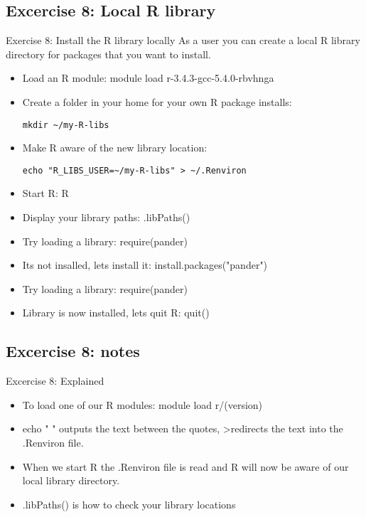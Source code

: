 \documentclass[handout]{beamer} %
\begin{document}
\subsection{Excercise 8: Local R library}
\begin{frame}[fragile]{Exercise 8: Install the R library locally}
As a user you can create a local R library directory for packages that you want to install. 
\begin{itemize}
\item Load an R module: 
module load r-3.4.3-gcc-5.4.0-rbvhnga
\item Create a folder in your home for your own R package installs:
\begin{verbatim}
mkdir ~/my-R-libs
\end{verbatim}
\item Make R aware of the new library location:
\begin{verbatim}
echo "R_LIBS_USER=~/my-R-libs" > ~/.Renviron
\end{verbatim}
\item Start R:
R
\item Display your library paths:
.libPaths()
\item Try loading a library:
require(pander)
\item Its not insalled, lets install it:
install.packages("pander")
\item Try loading a library:
require(pander)
\item Library is now installed, lets quit R:
quit()
\end{itemize}
\end{frame}

\subsection{Excercise 8: notes}
\begin{frame}[fragile]{Excercise 8: Explained}
\begin{itemize}
\item To load one of our R modules: module load r/(version)
\item echo " " outputs the text between the quotes, \textgreater redirects the text into the .Renviron file.
\item When we start R the .Renviron file is read and R will now be aware of our local library directory.
\item .libPaths() is how to check your library locations 
\end{itemize}
\end{frame}
\end{document}
